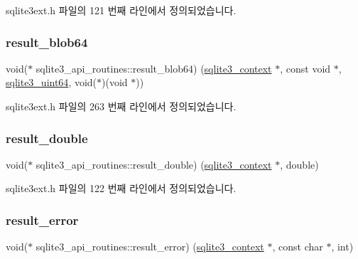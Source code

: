 sqlite3ext.\+h 파일의 121 번째 라인에서 정의되었습니다.

\mbox{\label{structsqlite3__api__routines_a35e4c25461a807bfdebca7fbc1d0bc74}} 
\subsubsection{\texorpdfstring{result\+\_\+blob64}{result\_blob64}}
{\footnotesize\ttfamily void($\ast$ sqlite3\+\_\+api\+\_\+routines\+::result\+\_\+blob64) (\hyperlink{sqlite3_8h_a3b519553ffec8fc42b2356f5b1ebdc57}{sqlite3\+\_\+context} $\ast$, const void $\ast$, \hyperlink{sqlite3_8h_a181c20ecfd72bc6627635746d382c610}{sqlite3\+\_\+uint64}, void($\ast$)(void $\ast$))}



sqlite3ext.\+h 파일의 263 번째 라인에서 정의되었습니다.

\mbox{\label{structsqlite3__api__routines_ae5babdc991a56b484bc7a66a993435f3}} 
\subsubsection{\texorpdfstring{result\+\_\+double}{result\_double}}
{\footnotesize\ttfamily void($\ast$ sqlite3\+\_\+api\+\_\+routines\+::result\+\_\+double) (\hyperlink{sqlite3_8h_a3b519553ffec8fc42b2356f5b1ebdc57}{sqlite3\+\_\+context} $\ast$, double)}



sqlite3ext.\+h 파일의 122 번째 라인에서 정의되었습니다.

\mbox{\label{structsqlite3__api__routines_ac80d799ae1e99289af007d9690ae3085}} 
\subsubsection{\texorpdfstring{result\+\_\+error}{result\_error}}
{\footnotesize\ttfamily void($\ast$ sqlite3\+\_\+api\+\_\+routines\+::result\+\_\+error) (\hyperlink{sqlite3_8h_a3b519553ffec8fc42b2356f5b1ebdc57}{sqlite3\+\_\+context} $\ast$, const char $\ast$, int)}



